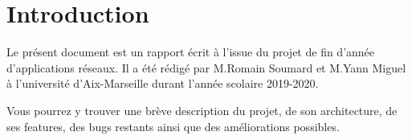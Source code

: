 \section{Introduction}

Le présent document est un rapport écrit à l'issue du projet de fin d'année d'applications réseaux. Il a été rédigé par M.Romain Soumard et M.Yann Miguel à l'université d'Aix-Marseille durant l'année scolaire 2019-2020.

Vous pourrez y trouver une brève description du projet, de son architecture, de ses features, des bugs restants ainsi que des améliorations possibles.